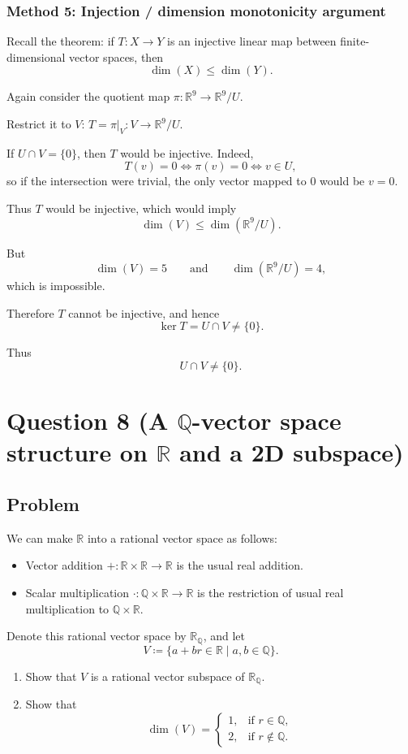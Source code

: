 \documentclass[12pt]{article}
\newcommand{\Q}{\mathbb{Q}}
\newcommand{\R}{\mathbb{R}}
\newcommand{\dimn}{\operatorname{dim}}
\begin{document}
\subsubsection{Method 5: Injection / dimension monotonicity argument}
Recall the theorem: if \(T:X\to Y\) is an injective linear map between finite-dimensional vector spaces, then
\[
\dimn(X)\le \dimn(Y).
\]

Again consider the quotient map
\(\pi:\R^9\to \R^9/U.
\)


Restrict it to \(V\):
\(
T=\pi|_V:V\to \R^9/U.
\)

If \(U\cap V=\{0\}\), then \(T\) would be injective. Indeed,
\[
T(v)=0 \iff \pi(v)=0 \iff v\in U,
\]
so if the intersection were trivial, the only vector mapped to \(0\) would be \(v=0\).

Thus \(T\) would be injective, which would imply
\[
\dimn(V)\le \dimn(\R^9/U).
\]

But
\[
\dimn(V)=5
\qquad
\text{and}
\qquad
\dimn(\R^9/U)=4,
\]
which is impossible.

Therefore \(T\) cannot be injective, and hence
\[
\ker T=U\cap V\neq \{0\}.
\]

Thus
\[
\boxed{U\cap V\neq \{0\}.}
\]
\newpage
\section{Question 8 (A \(\Q\)-vector space structure on \(\R\) and a 2D subspace)}
\subsection{Problem}
We can make \(\R\) into a rational vector space as follows:
\begin{itemize}[leftmargin=*]
\item Vector addition \(+:\R\times \R\to \R\) is the usual real addition.
\item Scalar multiplication \(\cdot:\Q\times \R\to \R\) is the restriction of usual real multiplication to \(\Q\times \R\).
\end{itemize}
Denote this rational vector space by \(\R_{\Q}\), and let
\[
V \coloneqq \{a+br\in\R \mid a,b\in\Q\}.
\]
\begin{enumerate}[label=(\alph*)]
\item Show that \(V\) is a rational vector subspace of \(\R_{\Q}\).
\item Show that
\[
\dimn(V)=
\begin{cases}
1, & \text{if } r\in\Q,\\
2, & \text{if } r\notin\Q.
\end{cases}
\]
\end{enumerate}
\end{document}
